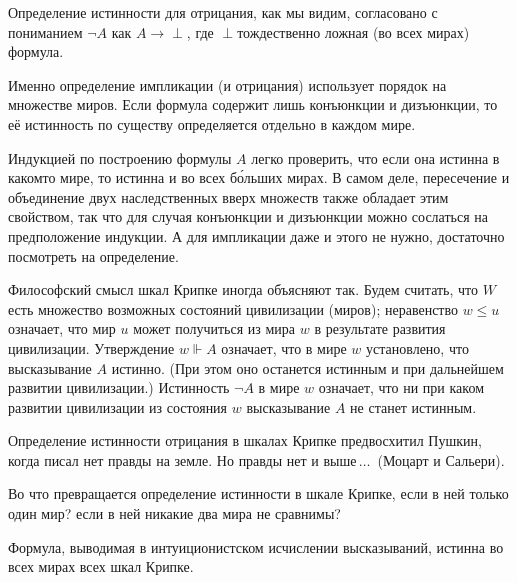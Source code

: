 Определение истинности для отрицания, как мы видим,
согласовано с пониманием $\lnot A$ как $A\to{\perp}$, где
$\perp$\т тождественно ложная (во всех мирах) формула.

Именно определение импликации (и отрицания) использует
порядок на множестве миров. Если формула содержит лишь
конъюнкции и дизъюнкции, то её истинность по существу
определяется отдельно в каждом мире.

Индукцией по построению формулы $A$ легко проверить, что если
она истинна в каком\д то мире, то истинна и во всех б\'ольших
мирах. В самом деле, пересечение и объединение двух
наследственных вверх множеств также обладает этим свойством, так
что для случая конъюнкции и дизъюнкции можно сослаться на
предположение индукции. А для импликации даже и этого не нужно,
достаточно посмотреть на определение.

Философский смысл шкал Крипке иногда объясняют так. Будем считать, что $W$
есть множество возможных состояний цивилизации (миров); неравенство $w\le u$
означает, что мир $u$ может получиться из мира $w$ в результате
развития цивилизации. Утверждение $w\Vdash A$ означает, что в
мире $w$ установлено, что высказывание $A$ истинно. (При этом
оно останется истинным и при дальнейшем развитии цивилизации.)
Истинность $\lnot A$ в мире $w$ означает, что ни при каком
развитии цивилизации из состояния $w$ высказывание $A$ не станет
истинным.

Определение истинности отрицания в шкалах Крипке предвосхитил
Пушкин,%
когда писал  нет правды на земле. Но правды нет и
выше\,$\ldots$\ (Моцарт и Сальери).%
%

\begin{problem}
Во что превращается определение истинности в шкале
Крипке, если в ней только один мир? если в ней никакие два
мира не сравнимы?
\end{problem}

\begin{theorem}
%
Формула, выводимая в интуиционистском исчислении
высказываний, истинна
во всех мирах всех шкал Крипке.
\end{theorem}

